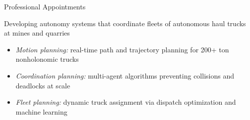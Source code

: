 \begin{rSection}{Professional Appointments}

Developing autonomy systems that coordinate fleets of autonomous haul trucks at mines and quarries
\begin{itemize}
    \item \textit{Motion planning:} real-time path and trajectory planning for 200+ ton nonholonomic trucks
    \item \textit{Coordination planning:} multi-agent algorithms preventing collisions and deadlocks at scale
    \item \textit{Fleet planning:} dynamic truck assignment via dispatch optimization and machine learning
\end{itemize}
\medskip


\end{rSection}
